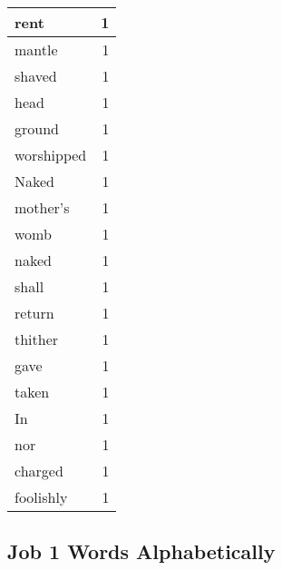 \begin{center}
\begin{longtable}{l|r}
rent & 1\\ \hline 
mantle & 1\\ \hline 
shaved & 1\\ \hline 
head & 1\\ \hline 
ground & 1\\ \hline 
worshipped & 1\\ \hline 
Naked & 1\\ \hline 
mother's & 1\\ \hline 
womb & 1\\ \hline 
naked & 1\\ \hline 
shall & 1\\ \hline 
return & 1\\ \hline 
thither & 1\\ \hline 
gave & 1\\ \hline 
taken & 1\\ \hline 
In & 1\\ \hline 
nor & 1\\ \hline 
charged & 1\\ \hline 
foolishly & 1\\ \hline 
\end{longtable}
\end{center}





\subsection{Job 1 Words Alphabetically}


\normalsize
 
